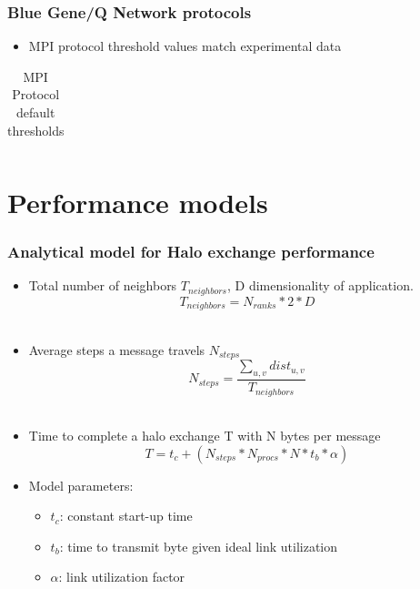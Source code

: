\documentclass{beamer}
\begin{document}
\begin{frame}[fragile]
\frametitle{Blue Gene/Q Network protocols}
\begin{itemize}
    \item MPI protocol threshold values match experimental data
\end{itemize}
\begin{table}
  \caption{MPI Protocol default thresholds
    \label{table:bgq_protocols}}
  {\footnotesize
    \begin{tabular}{ | l | l | l | p{1.5cm} |}
    \hline 
    
    \end{tabular}
  }
\end{table}
\end{frame}

\section{Performance models}
\begin{frame}
\frametitle{Analytical model for Halo exchange performance}
\begin{itemize}
\item Total number of neighbors $T_{neighbors}$, D dimensionality of application.
\begin{equation}
  T_{neighbors} = N_{ranks} * 2 * D
\end{equation} \\
\item Average steps a message travels $N_{steps}$
\begin{equation}
  N_{steps} = \frac{ \sum\limits_{u,v} dist_{u,v} } {T_{neighbors}}
\end{equation} \\
\item Time to complete a halo exchange T with N bytes per message
\begin{equation}
  T = t_c + (N_{steps} * N_{procs} * N * t_b * \alpha)
\end{equation}
\item Model parameters:
\begin{itemize}
  \item $t_c$: constant start-up time
  \item $t_b$: time to transmit byte given ideal link utilization
  \item $\alpha$: link utilization factor
\end{itemize}
\end{itemize}
\end{frame}
\end{document}
